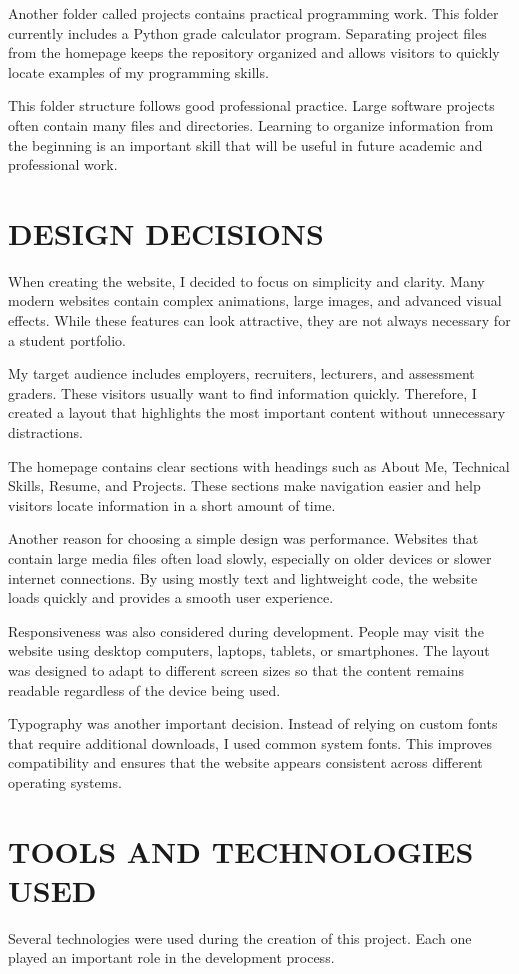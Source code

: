 \documentclass[12pt]{article}
\begin{document}
Another folder called projects contains practical programming work. This folder currently includes a Python grade calculator program. Separating project files from the homepage keeps the repository organized and allows visitors to quickly locate examples of my programming skills.

This folder structure follows good professional practice. Large software projects often contain many files and directories. Learning to organize information from the beginning is an important skill that will be useful in future academic and professional work.

\section*{DESIGN DECISIONS}
When creating the website, I decided to focus on simplicity and clarity. Many modern websites contain complex animations, large images, and advanced visual effects. While these features can look attractive, they are not always necessary for a student portfolio.

My target audience includes employers, recruiters, lecturers, and assessment graders. These visitors usually want to find information quickly. Therefore, I created a layout that highlights the most important content without unnecessary distractions.

The homepage contains clear sections with headings such as About Me, Technical Skills, Resume, and Projects. These sections make navigation easier and help visitors locate information in a short amount of time.

Another reason for choosing a simple design was performance. Websites that contain large media files often load slowly, especially on older devices or slower internet connections. By using mostly text and lightweight code, the website loads quickly and provides a smooth user experience.

Responsiveness was also considered during development. People may visit the website using desktop computers, laptops, tablets, or smartphones. The layout was designed to adapt to different screen sizes so that the content remains readable regardless of the device being used.

Typography was another important decision. Instead of relying on custom fonts that require additional downloads, I used common system fonts. This improves compatibility and ensures that the website appears consistent across different operating systems.

\section*{TOOLS AND TECHNOLOGIES USED}
Several technologies were used during the creation of this project. Each one played an important role in the development process.
\end{document}
